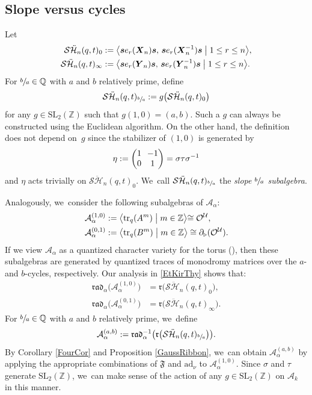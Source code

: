 \documentclass[JEP,XML,SOM,Unicode,published]{cedram}
\newcommand{\SL}{\mathrm{SL}}
\theoremstyle{definition}
\newcommand{\QQ}{\mathbb{Q}}
\newcommand{\ZZ}{\mathbb{Z}}
\newcommand{\OO}{\mathcal{O}}
\newcommand{\UU}{\mathcal{U}}
\newcommand{\AAA}{\mathcal{A}}
\newcommand{\SHH}{\mathcal{S}\ddot{\mathcal{H}}}
\newcommand{\ee}{\boldsymbol{s}}
\newcommand{\ad}{\mathrm{ad}}
\newcommand{\tr}{\mathrm{tr}}
\newcommand{\rrr}{\mathfrak{r}}
\begin{document}
\subsection{Slope versus cycles}
Let
\begin{equation*}
\begin{aligned}
\SHH_n(q,t)_0&:=\bigl\langle\ee e_r(\boldsymbol{X}_n)\ee,\,\ee e_r(\boldsymbol{X}_n^{-1})\ee\bigm| 1\le r\le n\bigr\rangle,
\\
\SHH_n(q,t)_\infty&:=\bigl\langle\ee e_r(\boldsymbol{Y}_n)\ee,\, \ee e_r(\boldsymbol{Y}_n^{-1})\ee\bigm| 1\le r\le n\bigr\rangle.
\end{aligned}
\end{equation*}
For $\sfrac{b}{a}\in\QQ$ with $a$ and $b$ relatively prime, define
\[
\SHH_n(q,t)_{\sfrac{b}{a}}:=g\bigl(\SHH_n(q,t)_0\bigr)
\]
for any $g\in \SL_2(\ZZ)$ such that $g(1,0)=(a,b)$.
Such a $g$ can always be constructed using the Euclidean algorithm.
On the other hand, the definition does not depend on~$g$ since the stabilizer of $(1,0)$ is generated by
\[\arraycolsep3.5pt
\eta:=
\begin{pmatrix}
1 & -1\\
0 & 1
\end{pmatrix}
=\sigma\tau\sigma^{-1}
\]
and $\eta$ acts trivially on $\SHH_n(q,t)_0$. We~call $\SHH_n(q,t)_{\sfrac{b}{a}}$ the \textit{slope $\sfrac{b}{a}$ subalgebra}.

Analogously, we~consider the following subalgebras of $\AAA_\alpha$:
\begin{align*}
\AAA_\alpha^{(1,0)}&:=\bigl\langle\tr_q(A^m)\bigm| m\in\ZZ\bigl\rangle\cong\OO^\UU,\\
\AAA_\alpha^{(0,1)}&:=\bigl\langle\tr_q(B^m)\bigm| m\in\ZZ\bigr\rangle\cong\partial_{\triangleright}(\OO^\UU).
\end{align*}
If we view $\AAA_\alpha$ as a quantized character variety for the torus (\cf \cite{AlekScho, BBJ1, BBJ2}), then these subalgebras are generated by quantized traces of monodromy matrices over the $a$- and $b$-cycles, respectively.
Our analysis in \ref{EtKirThy} shows that:
\begin{align*}
\mathfrak{rad}_\alpha\bigl(\AAA_\alpha^{(1,0)}\bigr)&=\rrr\bigl(\SHH_n(q,t)_0\bigr),\\
\mathfrak{rad}_\alpha\bigl(\AAA_\alpha^{(0,1)}\bigr)&= \rrr\bigl(\SHH_n(q,t)_\infty\bigr).
\end{align*}
For $\sfrac{b}{a}\in\QQ$ with $a$ and $b$ relatively prime, we~define
\[
\AAA_{\alpha}^{(a,b)}:=\mathfrak{rad}_\alpha^{-1}\bigl(\rrr\bigl(\SHH_n(q,t)_{\sfrac{b}{a}} \bigr) \bigr).
\]
By Corollary \ref{FourCor} and Proposition \ref{GaussRibbon}, we~can obtain $\AAA_{\alpha}^{(a,b)}$ by applying the appropriate combinations of $\mathfrak{F}$ and $\ad_{\nu}$ to $\AAA_{\alpha}^{(1,0)}$.
Since $\sigma$ and $\tau$ generate $\SL_2(\ZZ)$, we~can make sense of the action of any $g\in \SL_2(\ZZ)$ on $\AAA_k$ in this manner.
\end{document}
